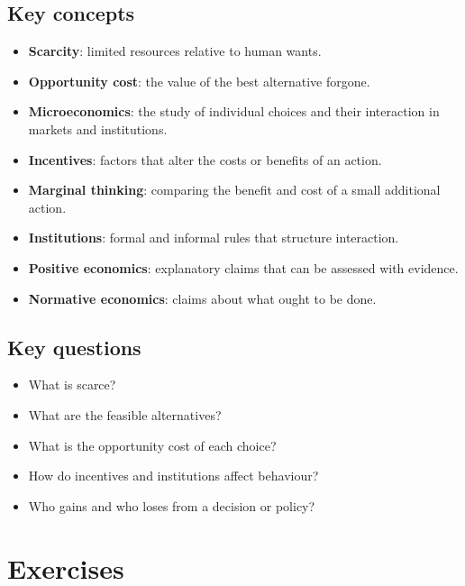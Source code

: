 \subsection*{Key concepts}
\begin{itemize}
  \item \textbf{Scarcity}: limited resources relative to human wants.
  \item \textbf{Opportunity cost}: the value of the best alternative forgone.
  \item \textbf{Microeconomics}: the study of individual choices and their interaction in markets and institutions.
  \item \textbf{Incentives}: factors that alter the costs or benefits of an action.
  \item \textbf{Marginal thinking}: comparing the benefit and cost of a small additional action.
  \item \textbf{Institutions}: formal and informal rules that structure interaction.
  \item \textbf{Positive economics}: explanatory claims that can be assessed with evidence.
  \item \textbf{Normative economics}: claims about what ought to be done.
\end{itemize}

\subsection*{Key questions}
\begin{itemize}
  \item What is scarce?
  \item What are the feasible alternatives?
  \item What is the opportunity cost of each choice?
  \item How do incentives and institutions affect behaviour?
  \item Who gains and who loses from a decision or policy?
\end{itemize}

\section*{Exercises}

